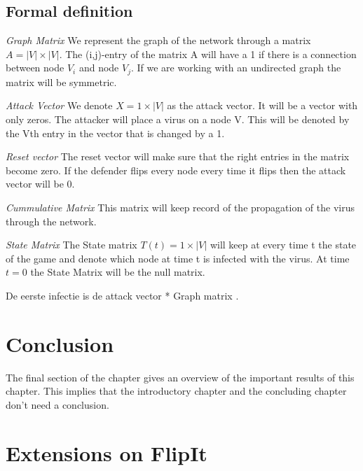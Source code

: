 \begin{description}
\subsection{Formal definition}
\begin{description}
\item \textit{Graph Matrix} We represent the graph of the network through a matrix $ A = |V| \times |V|$. The (i,j)-entry of the matrix A will have a 1 if there is a connection between node $V_{i}$ and node $V_{j}$. If we are working with an undirected graph the matrix will be symmetric. 
\item \textit{Attack Vector} We denote $X = 1 \times |V|$ as the attack vector. It will be a vector with only zeros. The attacker will place a virus on a node V. This will be denoted by the Vth entry in the vector that is changed by a 1.
\item \textit{Reset vector} The reset vector will make sure that the right entries in the matrix become zero. If the defender flips every node every time it flips then the attack vector will be 0.
\item \textit{Cummulative Matrix} This matrix will keep record of the propagation of the virus through the network.
\item \textit{State Matrix} The State matrix $T(t) = 1 \times |V| $ will keep at every time t the state of the game and denote which node at time t is infected with the virus. At time $t=0$ the State Matrix will be the null matrix.
\end{description}
De eerste infectie is de attack vector * Graph matrix . 
\end{description}


\section{Conclusion}
The final section of the chapter gives an overview of the important results
of this chapter. This implies that the introductory chapter and the
concluding chapter don't need a conclusion.

\section{Extensions on FlipIt}



